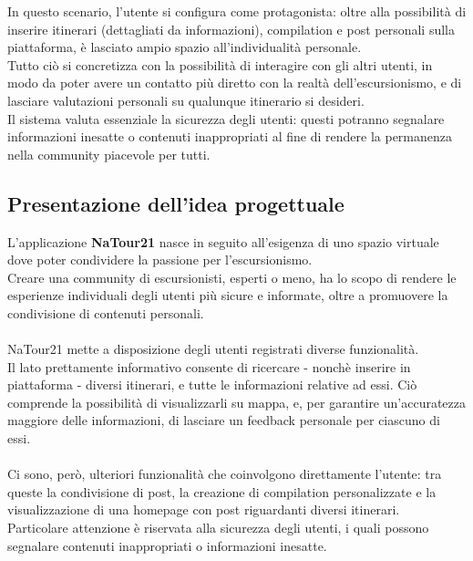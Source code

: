 \documentclass{natourDoc}
\begin{document}
In questo scenario, l'utente si configura come protagonista: oltre alla possibilità di inserire itinerari (dettagliati da informazioni), compilation e post personali sulla piattaforma,
è lasciato ampio spazio all'individualità personale.\\

Tutto ciò si concretizza con la possibilità di interagire con gli altri utenti, in modo da poter avere un contatto più diretto con
la realtà dell'escursionismo, e di lasciare valutazioni personali su qualunque itinerario si desideri.\\

Il sistema valuta essenziale la sicurezza degli utenti: questi potranno segnalare informazioni inesatte o contenuti inappropriati al fine
di rendere la permanenza nella community piacevole per tutti.

\subsection{Presentazione dell'idea progettuale}

L'applicazione \textbf{NaTour21} nasce in seguito all'esigenza di uno spazio virtuale dove poter condividere la passione per l'escursionismo.\\
Creare una community di escursionisti, esperti o meno, ha lo scopo di rendere le esperienze individuali degli utenti più sicure e informate,
oltre a promuovere la condivisione di contenuti personali.\\\\
NaTour21 mette a disposizione degli utenti registrati diverse funzionalità.\\
Il lato prettamente informativo consente di ricercare - nonchè inserire in piattaforma - diversi itinerari, e tutte le informazioni relative ad essi.
Ciò comprende la possibilità di visualizzarli su mappa, e, per garantire un'accuratezza maggiore delle informazioni, di lasciare
un feedback personale per ciascuno di essi.\\\\
Ci sono, però, ulteriori funzionalità che coinvolgono direttamente l'utente: tra queste la condivisione di post, la creazione di compilation personalizzate e
la visualizzazione di una homepage con post riguardanti diversi itinerari.\\
Particolare attenzione è riservata alla sicurezza degli utenti, i quali possono segnalare contenuti inappropriati o informazioni inesatte.
\end{document}
